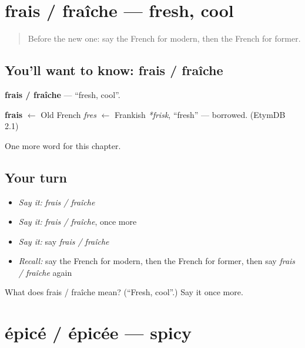 \section[frais / fraîche]{frais / fraîche — fresh, cool}

\label{lesson:FR-C161-frais-fraiche}



\begin{quote}
Before the new one: say the French for modern, then the French for former.
\end{quote}

\subsection*{You'll want to know: frais / fraîche}
\textbf{frais / fraîche} — \textquotedblleft{}fresh, cool\textquotedblright{}.

\begin{cousinweb}
\textbf{frais} $\leftarrow$ Old French \emph{fres} $\leftarrow$ Frankish \emph{*frisk}, \textquotedblleft{}fresh\textquotedblright{} — borrowed. (EtymDB 2.1)
\end{cousinweb}

\begin{grammarlens}[title={What you've built}]
One more word for this chapter.
\end{grammarlens}

\subsection*{Your turn}
\begin{itemize}
\raggedright
  \item \emph{Say it:} \emph{frais / fraîche}
  \item \emph{Say it:} \emph{frais / fraîche}, once more
  \item \emph{Say it:} say \emph{frais / fraîche}
  \item \emph{Recall:} say the French for modern, then the French for former, then say \emph{frais / fraîche} again
\end{itemize}

\begin{tcolorbox}[breakable,colback=teal!4,colframe=teal!35!black,title={Before you move on}]
What does frais / fraîche mean? (\textquotedblleft{}Fresh, cool\textquotedblright{}.) Say it once more.
\end{tcolorbox}
\section[épicé / épicée]{épicé / épicée — spicy}

